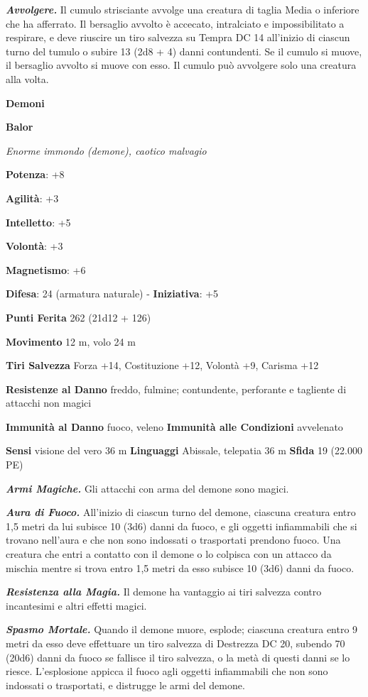 \begin{multicols}{2}
\emph{\textbf{Avvolgere.}} Il cumulo strisciante avvolge una creatura di
taglia Media o inferiore che ha afferrato. Il bersaglio avvolto è
accecato, intralciato e impossibilitato a respirare, e deve riuscire un
tiro salvezza su Tempra DC 14 all'inizio di ciascun turno del
tumulo o subire 13 (2d8 + 4) danni contundenti. Se il cumulo si muove,
il bersaglio avvolto si muove con esso. Il cumulo può avvolgere solo una
creatura alla volta.

\textbf{Demoni}

\textbf{Balor}

\emph{Enorme immondo (demone), caotico malvagio}

\textbf{Potenza}: +8

\textbf{Agilità}: +3

\textbf{Intelletto}: +5

\textbf{Volontà}: +3

\textbf{Magnetismo}: +6

\textbf{Difesa}: 24 (armatura naturale) - \textbf{Iniziativa}: +5

\textbf{Punti Ferita} 262 (21d12 + 126)

\textbf{Movimento} 12 m, volo 24 m

\textbf{Tiri Salvezza} Forza +14, Costituzione +12, Volontà +9, Carisma
+12

\textbf{Resistenze al Danno} freddo, fulmine; contundente, perforante e
tagliente di attacchi non magici

\textbf{Immunità al Danno} fuoco, veleno \textbf{Immunità alle
Condizioni} avvelenato

\textbf{Sensi} visione del vero 36 m
\textbf{Linguaggi} Abissale, telepatia 36 m \textbf{Sfida} 19 (22.000
PE)

\emph{\textbf{Armi Magiche.}} Gli attacchi con arma del demone sono
magici.

\emph{\textbf{Aura di Fuoco.}} All'inizio di ciascun turno del demone,
ciascuna creatura entro 1,5 metri da lui subisce 10 (3d6) danni da
fuoco, e gli oggetti infiammabili che si trovano nell'aura e che non
sono indossati o trasportati prendono fuoco. Una creatura che entri a
contatto con il demone o lo colpisca con un attacco da mischia mentre si
trova entro 1,5 metri da esso subisce 10 (3d6) danni da fuoco.

\emph{\textbf{Resistenza alla Magia.}} Il demone ha vantaggio ai tiri
salvezza contro incantesimi e altri effetti magici.

\emph{\textbf{Spasmo Mortale.}} Quando il demone muore, esplode;
ciascuna creatura entro 9 metri da esso deve effettuare un tiro salvezza
di Destrezza DC 20, subendo 70 (20d6) danni da fuoco se fallisce il tiro
salvezza, o la metà di questi danni se lo riesce. L'esplosione appicca
il fuoco agli oggetti infiammabili che non sono indossati o trasportati,
e distrugge le armi del demone.


\end{multicols}
